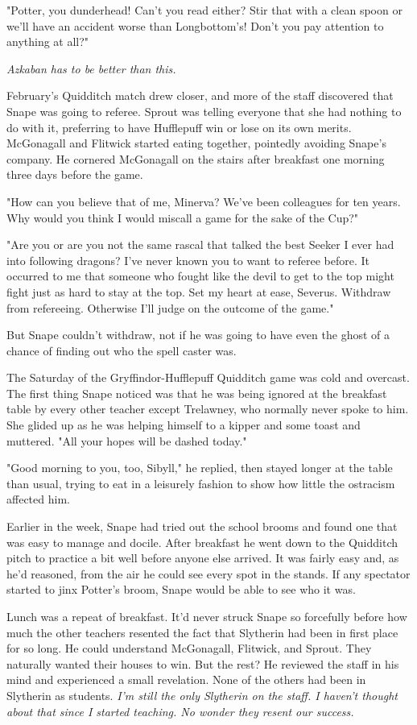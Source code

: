 \documentclass[a4paper,11pt]{article}
\begin{document}
"Potter, you dunderhead! Can't you read either? Stir that with a clean spoon or we'll have an accident worse than Longbottom's! Don't you pay attention to anything at all?"

\emph{Azkaban has to be better than this.}

February's Quidditch match drew closer, and more of the staff discovered that Snape was going to referee. Sprout was telling everyone that she had nothing to do with it, preferring to have Hufflepuff win or lose on its own merits. McGonagall and Flitwick started eating together, pointedly avoiding Snape's company. He cornered McGonagall on the stairs after breakfast one morning three days before the game.

"How can you believe that of me, Minerva? We've been colleagues for ten years. Why would you think I would miscall a game for the sake of the Cup?"

"Are you or are you not the same rascal that talked the best Seeker I ever had into following dragons? I've never known you to want to referee before. It occurred to me that someone who fought like the devil to get to the top might fight just as hard to stay at the top. Set my heart at ease, Severus. Withdraw from refereeing. Otherwise I'll judge on the outcome of the game."

But Snape couldn't withdraw, not if he was going to have even the ghost of a chance of finding out who the spell caster was.

The Saturday of the Gryffindor-Hufflepuff Quidditch game was cold and overcast. The first thing Snape noticed was that he was being ignored at the breakfast table by every other teacher except Trelawney, who normally never spoke to him. She glided up as he was helping himself to a kipper and some toast and muttered. "All your hopes will be dashed today."

"Good morning to you, too, Sibyll," he replied, then stayed longer at the table than usual, trying to eat in a leisurely fashion to show how little the ostracism affected him.

Earlier in the week, Snape had tried out the school brooms and found one that was easy to manage and docile. After breakfast he went down to the Quidditch pitch to practice a bit well before anyone else arrived. It was fairly easy and, as he'd reasoned, from the air he could see every spot in the stands. If any spectator started to jinx Potter's broom, Snape would be able to see who it was.

Lunch was a repeat of breakfast. It'd never struck Snape so forcefully before how much the other teachers resented the fact that Slytherin had been in first place for so long. He could understand McGonagall, Flitwick, and Sprout. They naturally wanted their houses to win. But the rest? He reviewed the staff in his mind and experienced a small revelation. None of the others had been in Slytherin as students. \emph{I'm still the only Slytherin on the staff. I haven't thought about that since I started teaching. No wonder they resent our success.}
\end{document}
